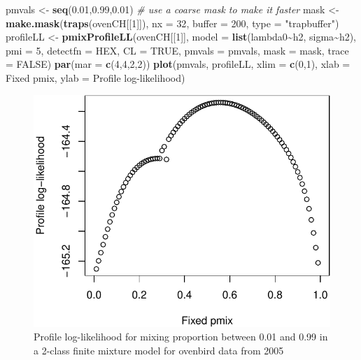 \documentclass[
]{book}
\newenvironment{Shaded}{\begin{snugshade}}{\end{snugshade}}
\newcommand{\AttributeTok}[1]{\textcolor[rgb]{0.13,0.29,0.53}{#1}}
\newcommand{\CommentTok}[1]{\textcolor[rgb]{0.56,0.35,0.01}{\textit{#1}}}
\newcommand{\ConstantTok}[1]{\textcolor[rgb]{0.56,0.35,0.01}{#1}}
\newcommand{\DecValTok}[1]{\textcolor[rgb]{0.00,0.00,0.81}{#1}}
\newcommand{\FloatTok}[1]{\textcolor[rgb]{0.00,0.00,0.81}{#1}}
\newcommand{\FunctionTok}[1]{\textcolor[rgb]{0.13,0.29,0.53}{\textbf{#1}}}
\newcommand{\NormalTok}[1]{#1}
\newcommand{\OtherTok}[1]{\textcolor[rgb]{0.56,0.35,0.01}{#1}}
\newcommand{\SpecialCharTok}[1]{\textcolor[rgb]{0.81,0.36,0.00}{\textbf{#1}}}
\newcommand{\StringTok}[1]{\textcolor[rgb]{0.31,0.60,0.02}{#1}}
\begin{document}
\begin{Shaded}
\begin{Highlighting}[]
\NormalTok{pmvals }\OtherTok{\textless{}{-}} \FunctionTok{seq}\NormalTok{(}\FloatTok{0.01}\NormalTok{,}\FloatTok{0.99}\NormalTok{,}\FloatTok{0.01}\NormalTok{)}
\CommentTok{\# use a coarse mask to make it faster}
\NormalTok{mask }\OtherTok{\textless{}{-}} \FunctionTok{make.mask}\NormalTok{(}\FunctionTok{traps}\NormalTok{(ovenCH[[}\DecValTok{1}\NormalTok{]]), }\AttributeTok{nx =} \DecValTok{32}\NormalTok{, }\AttributeTok{buffer =} \DecValTok{200}\NormalTok{, }
    \AttributeTok{type =} \StringTok{"trapbuffer"}\NormalTok{)}
\NormalTok{profileLL }\OtherTok{\textless{}{-}} \FunctionTok{pmixProfileLL}\NormalTok{(ovenCH[[}\DecValTok{1}\NormalTok{]], }\AttributeTok{model =} \FunctionTok{list}\NormalTok{(lambda0}\SpecialCharTok{\textasciitilde{}}\NormalTok{h2, }
\NormalTok{    sigma}\SpecialCharTok{\textasciitilde{}}\NormalTok{h2), }\AttributeTok{pmi =} \DecValTok{5}\NormalTok{, }\AttributeTok{detectfn =} \StringTok{\textquotesingle{}HEX\textquotesingle{}}\NormalTok{, }\AttributeTok{CL =} \ConstantTok{TRUE}\NormalTok{, }\AttributeTok{pmvals =} 
\NormalTok{    pmvals, }\AttributeTok{mask =}\NormalTok{ mask, }\AttributeTok{trace =} \ConstantTok{FALSE}\NormalTok{)}
\FunctionTok{par}\NormalTok{(}\AttributeTok{mar =} \FunctionTok{c}\NormalTok{(}\DecValTok{4}\NormalTok{,}\DecValTok{4}\NormalTok{,}\DecValTok{2}\NormalTok{,}\DecValTok{2}\NormalTok{))}
\FunctionTok{plot}\NormalTok{(pmvals, profileLL, }\AttributeTok{xlim =} \FunctionTok{c}\NormalTok{(}\DecValTok{0}\NormalTok{,}\DecValTok{1}\NormalTok{), }\AttributeTok{xlab =} \StringTok{\textquotesingle{}Fixed pmix\textquotesingle{}}\NormalTok{, }
     \AttributeTok{ylab =} \StringTok{\textquotesingle{}Profile log{-}likelihood\textquotesingle{}}\NormalTok{)}
\end{Highlighting}
\end{Shaded}

\begin{figure}
\centering
\includegraphics{SECRbook_files/figure-latex/pmixprofile-1.pdf}
\caption{\label{fig:pmixprofile}Profile log-likelihood for mixing proportion between 0.01 and 0.99 in a 2-class finite mixture model for ovenbird data from 2005}
\end{figure}
\end{document}

